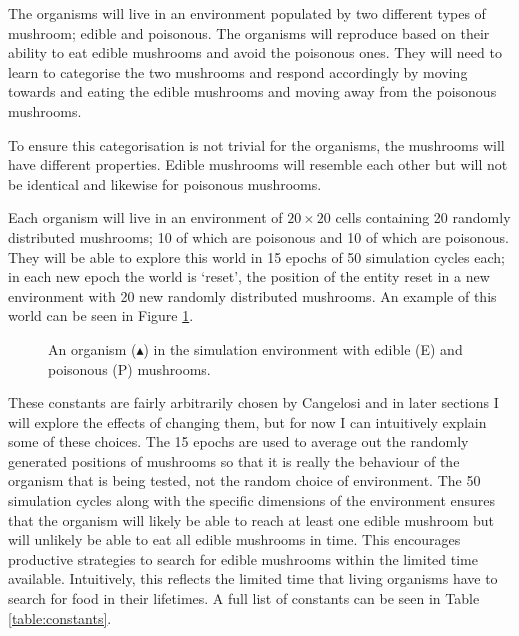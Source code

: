 \documentclass[12pt,a4paper,twoside,openright]{report}
\begin{document}
The organisms will live in an environment populated by two different types of mushroom; edible and poisonous. The organisms will reproduce based on their ability to eat edible mushrooms and avoid the poisonous ones. They will need to learn to categorise the two mushrooms and respond accordingly by moving towards and eating the edible mushrooms and moving away from the poisonous mushrooms.

To ensure this categorisation is not trivial for the organisms, the mushrooms will have different properties. Edible mushrooms will resemble each other but will not be identical and likewise for poisonous mushrooms.

Each organism will live in an environment of $20 \times 20$ cells containing 20 randomly distributed mushrooms; 10 of which are poisonous and 10 of which are poisonous. They will be able to explore this world in 15 epochs of 50 simulation cycles each; in each new epoch the world is `reset', the position of the entity reset in a new environment with 20 new randomly distributed mushrooms. An example of this world can be seen in Figure \ref{fig:environment}.

\begin{figure}[h]
\centering
{}
\caption{An organism ($\blacktriangle$) in the simulation environment with edible (E) and poisonous (P) mushrooms.}
\label{fig:environment}
\end{figure}

These constants are fairly arbitrarily chosen by Cangelosi and in later sections I will explore the effects of changing them, but for now I can intuitively explain some of these choices. The 15 epochs are used to average out the randomly generated positions of mushrooms so that it is really the behaviour of the organism that is being tested, not the random choice of environment. The 50 simulation cycles along with the specific dimensions of the environment ensures that the organism will likely be able to reach at least one edible mushroom but will unlikely be able to eat all edible mushrooms in time. This encourages productive strategies to search for edible mushrooms within the limited time available. Intuitively, this reflects the limited time that living organisms have to search for food in their lifetimes. A full list of constants can be seen in Table \ref{table:constants}.
\end{document}
